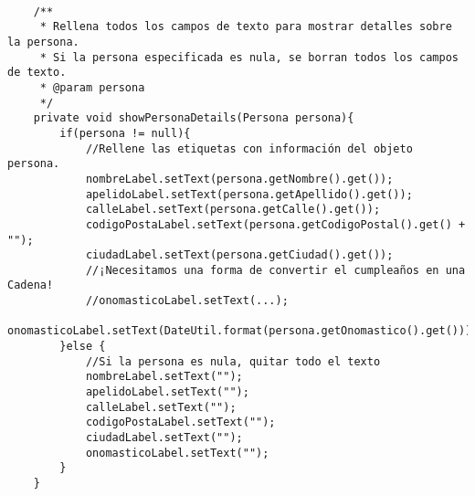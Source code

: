 \begin{verbatim}

    /**
	 * Rellena todos los campos de texto para mostrar detalles sobre la persona.
	 * Si la persona especificada es nula, se borran todos los campos de texto.
	 * @param persona
	 */
	private void showPersonaDetails(Persona persona){
		if(persona != null){
			//Rellene las etiquetas con información del objeto persona.
			nombreLabel.setText(persona.getNombre().get());
			apelidoLabel.setText(persona.getApellido().get());
			calleLabel.setText(persona.getCalle().get());
			codigoPostaLabel.setText(persona.getCodigoPostal().get() + "");
			ciudadLabel.setText(persona.getCiudad().get());
			//¡Necesitamos una forma de convertir el cumpleaños en una Cadena!
			//onomasticoLabel.setText(...);
			onomasticoLabel.setText(DateUtil.format(persona.getOnomastico().get()));
		}else {
			//Si la persona es nula, quitar todo el texto
			nombreLabel.setText("");
			apelidoLabel.setText("");
			calleLabel.setText("");
			codigoPostaLabel.setText("");
			ciudadLabel.setText("");
			onomasticoLabel.setText("");
		}
	}

\end{verbatim}